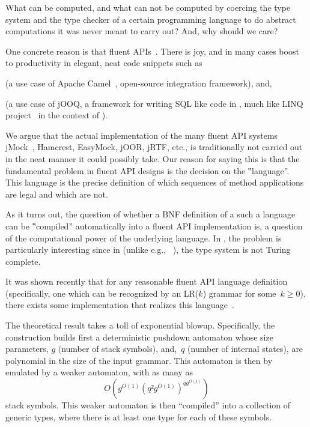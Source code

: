 What can be computed, and what can not be computed by coercing the type system
and the type checker of a certain programming language to do abstract
computations it was never meant to carry out? And, why should we care?

One concrete reason is that fluent
APIs~\cite{VanDeursen:Klint:2000,Hudak:1997,Fowler:2010}.  There is joy, and in
many cases boost to productivity in elegant, neat code snippets such as
\begin{quote}
  \label{figure:DSL}
  \parbox[c]{44ex}{}
\end{quote}
(a use case of Apache Camel~\cite{Ibsen:Anstey:10}, open-source integration
framework), and,
\begin{quote}
\end{quote}
(a use case of jOOQ, a framework for writing
SQL like code in \Java, much like LINQ project~\cite{Meijer:Beckman:Bierman:06}
in the context of \CSharp).

We argue that
the actual implementation of the many fluent API systems
jMock~\cite{Freeman:Pryce:06},
Hamcrest,
EasyMock,
jOOR,
jRTF,
etc., is traditionally not carried out
in the neat manner it could possibly take.
Our reason for saying this is that the fundamental problem in
fluent API designs is the decision on the ‟language”.
This language is the precise definition of which sequences of method
applications are legal and which are not.

As it turns out, the question of whether a BNF definition of a such a language
can be ‟compiled” automatically into a fluent API implementation is, a
question of the computational power of the underlying language. In \Java, the problem
is particularly interesting since in \Java (unlike e.g., \CC~\cite{Gutterman:2003}),
the type system is not Turing complete.

It was shown recently that for any reasonable fluent API language definition
(specifically, one which can be recognized by an LR($k$) grammar for some~$k
≥0$), there exists some \Java implementation that realizes this
language~\cite{Gil:Levy:2016}.

The theoretical result takes a toll of exponential blowup. Specifically, the
construction builds first a deterministic pushdown automaton whose size
parameters, $g$ (number of stack symbols), and,~$q$ (number of internal
states), are polynomial in the size of the input grammar. This automaton is then
by emulated by a weaker automaton, with as many as
\[
  O\left(g^{O(1)}\left(q²g^{O(1)}\right)^{qg^{O(1)}}\right)
\] 
stack symbols.
This weaker automaton is then ``compiled'' into a  collection of generic \Java types,
where there is at least one type for each of these symbols.

